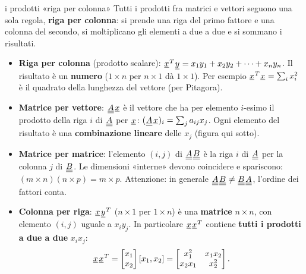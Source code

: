 \begin{richiamo}{i prodotti «riga per colonna»}
Tutti i prodotti fra matrici e vettori seguono una sola regola, \textbf{riga per colonna}: si prende una riga del primo
fattore e una colonna del secondo, si moltiplicano gli elementi a due a due e si sommano i risultati.
\begin{itemize}
  \item \textbf{Riga per colonna} (prodotto scalare): ${\mkern1mu\underline{x}\mkern1mu}^T {\mkern1mu\underline{y}\mkern1mu} = x_1 y_1 + x_2 y_2 + \cdots + x_n y_n$. Il
        risultato è un \textbf{numero} ($1 \times n$ per $n \times 1$ dà $1 \times 1$). Per esempio
        ${\mkern1mu\underline{x}\mkern1mu}^T {\mkern1mu\underline{x}\mkern1mu} = \sum_i x_i^2$ è il quadrato della lunghezza del vettore (per Pitagora).
  \item \textbf{Matrice per vettore}: ${\mkern1mu\underline{\underline{A}}\mkern1mu}{\mkern1mu\underline{x}\mkern1mu}$ è il vettore che ha per elemento $i$-esimo il prodotto della
        riga $i$ di ${\mkern1mu\underline{\underline{A}}\mkern1mu}$ per ${\mkern1mu\underline{x}\mkern1mu}$: $({\mkern1mu\underline{\underline{A}}\mkern1mu}{\mkern1mu\underline{x}\mkern1mu})_i = \sum_j a_{ij} x_j$. Ogni elemento del risultato è
        una \textbf{combinazione lineare} delle $x_j$ (figura qui sotto).
  \item \textbf{Matrice per matrice}: l'elemento $(i, j)$ di ${\mkern1mu\underline{\underline{A}}\mkern1mu}{\mkern1mu\underline{\underline{B}}\mkern1mu}$ è la riga $i$ di ${\mkern1mu\underline{\underline{A}}\mkern1mu}$ per la
        colonna $j$ di ${\mkern1mu\underline{\underline{B}}\mkern1mu}$. Le dimensioni «interne» devono coincidere e spariscono:
        $(m \times n)(n \times p) = m \times p$. Attenzione: in generale ${\mkern1mu\underline{\underline{A}}\mkern1mu}{\mkern1mu\underline{\underline{B}}\mkern1mu} \neq {\mkern1mu\underline{\underline{B}}\mkern1mu}{\mkern1mu\underline{\underline{A}}\mkern1mu}$,
        l'ordine dei fattori conta.
  \item \textbf{Colonna per riga}: ${\mkern1mu\underline{x}\mkern1mu}{\mkern1mu\underline{y}\mkern1mu}^T$ ($n \times 1$ per $1 \times n$) è una \textbf{matrice}
        $n \times n$, con elemento $(i, j)$ uguale a $x_i y_j$. In particolare ${\mkern1mu\underline{x}\mkern1mu}{\mkern1mu\underline{x}\mkern1mu}^T$ contiene
        \textbf{tutti i prodotti a due a due} $x_i x_j$:
        \[ {\mkern1mu\underline{x}\mkern1mu}{\mkern1mu\underline{x}\mkern1mu}^T = \begin{bmatrix} x_1 \\ x_2 \end{bmatrix} [x_1, x_2] = \begin{bmatrix} x_1^2 & x_1 x_2
           \\ x_2 x_1 & x_2^2 \end{bmatrix} . \]
\end{itemize}
\begin{center}
\end{center}
\end{richiamo}
